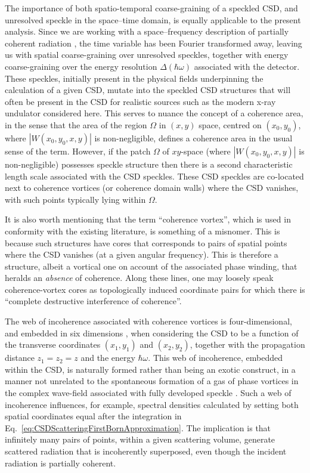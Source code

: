 \documentclass{iucr}              %
\begin{document}
The importance of both spatio-temporal coarse-graining of a speckled CSD, and unresolved speckle in the space--time domain, is equally applicable to the present analysis.  Since we are working with a space--frequency description of partially coherent radiation \cite{Wolf1982}, the time variable has been Fourier transformed away, leaving us with spatial coarse-graining over unresolved speckles, together with energy coarse-graining over the energy resolution $\Delta(\hbar\omega)$ associated with the detector.  These speckles, initially present in the physical fields underpinning the calculation of a given CSD, mutate into the speckled CSD structures that will often be present in the CSD for realistic sources such as the modern x-ray undulator considered here.  This serves to nuance the concept of a coherence area, in the sense that the area of the region $\Omega$ in $(x,y)$ space, centred on $(x_0,y_0)$, where $|W(x_0,y_0,x,y)|$ is non-negligible, defines a coherence area in the usual sense of the term.  However, if the patch $\Omega$ of $xy$-space (where $|W(x_0,y_0,x,y)|$ is non-negligible) possesses speckle structure then there is a second characteristic length scale associated with the CSD speckles.  These CSD speckles are co-located next to coherence vortices (or coherence domain walls) where the CSD vanishes, with such points typically lying within $\Omega$.

It is also worth mentioning that the term ``coherence vortex'', which is used in conformity with the existing literature, is something of a misnomer.  This is because such structures have cores that corresponds to pairs of spatial points where the CSD vanishes (at a given angular frequency).  This is therefore a structure, albeit a vortical one on account of the associated phase winding, that heralds an {\em absence} of coherence. Along these lines, one may loosely speak coherence-vortex cores as topologically induced coordinate pairs for which there is ``complete destructive interference of coherence''.

The web of incoherence associated with coherence vortices is four-dimensional, and embedded in six dimensions \cite{Marasinghe2010}, when considering the CSD to be a function of the transverse coordinates $(x_1,y_1)$ and $(x_2,y_2)$, together with the propagation distance $z_1=z_2=z$ and the energy $\hbar\omega$.  This web of incoherence, embedded within the CSD, is naturally formed rather than being an exotic construct, in a manner not unrelated to the spontaneous formation of a gas of phase vortices in the complex wave-field associated with fully developed speckle \cite{OHolleran2008}.  Such a web of incoherence influences, for example, spectral densities calculated by setting both spatial coordinates equal after the integration in Eq.~\ref{eq:CSDScatteringFirstBornApproximation}.  The implication is that infinitely many pairs of points, within a given scattering volume, generate scattered radiation that is incoherently superposed, even though the incident radiation is partially coherent.
\end{document}
